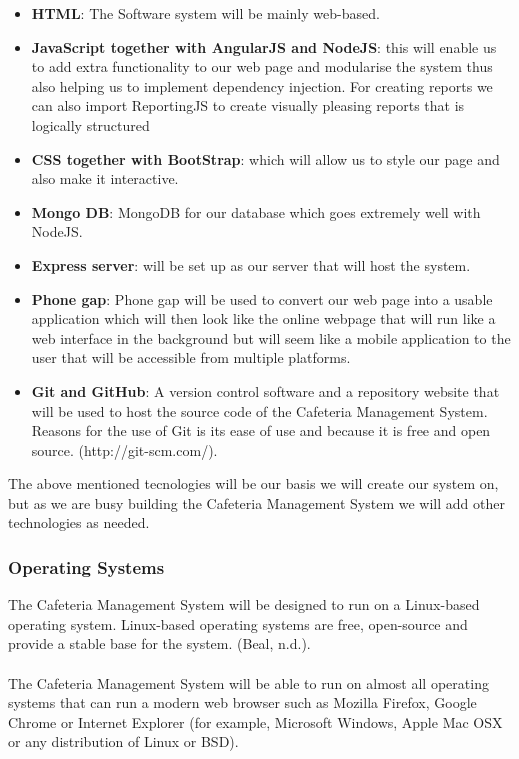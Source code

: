 \documentclass[12pt]{article}
\begin{document}
\begin{itemize}
  \item \textbf{HTML}: The Software system will be mainly web-based.

  \item \textbf{JavaScript together with AngularJS  and NodeJS}: this will enable us to add extra functionality to our web page and modularise the system thus also helping us to implement dependency injection. For creating reports we can also import ReportingJS to create visually pleasing reports that is logically structured

 \item \textbf{CSS together with BootStrap}: which will allow us to style our page and also make it interactive.

 \item \textbf{Mongo DB}: MongoDB for our database which goes extremely well with NodeJS. 

 \item \textbf{Express server}: will be set up as our server that will host the system.

 \item \textbf{Phone gap}: Phone gap will be used to convert our web page into a usable application which will then look like the online webpage that will run like a web interface in the background but  will seem like a mobile application to the user that will be accessible from multiple platforms.

\item \textbf{Git and GitHub}: A version control software and a repository website that will be used to host the source code of the Cafeteria Management System. Reasons for the use of Git is its ease of use and because it is free and open source. (http://git-scm.com/).

\end{itemize}
The above mentioned tecnologies will be our basis we will create our system on, but as we are busy building the Cafeteria Management System we will add other technologies as needed. 

\subsubsection{Operating Systems}
The Cafeteria Management System will be designed to run on a Linux-based operating system. Linux-based operating systems are free, open-source and provide a stable base for the system. (Beal, n.d.).\\
\\
The Cafeteria Management System will be able to run on almost all operating systems that can run a modern web browser such as Mozilla Firefox, Google Chrome or Internet Explorer (for example, Microsoft Windows, Apple Mac OSX or any distribution of Linux or BSD).
\end{document}
